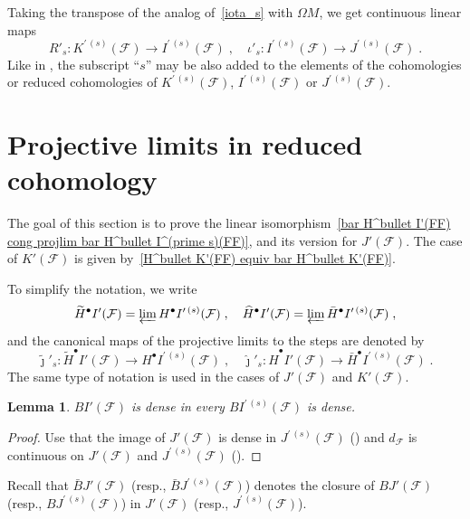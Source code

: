 \documentclass{memo-l}
\theoremstyle{plain}
\newtheorem{lem}[thm]{Lemma}
\theoremstyle{definition}
\theoremstyle{remark}
\newcommand{\FF}{\mathcal{F}}
\numberwithin{section}{chapter}
\numberwithin{equation}{section}%
\begin{document}
Taking the transpose of the analog of~\eqref{iota_s} with $\Omega M$, we get continuous linear maps  
\begin{equation}\label{R'_s}
R'_s:K^{\prime\,(s)}(\FF) \to I^{\prime\,(s)}(\FF)\;,\quad \iota'_s:I^{\prime\,(s)}(\FF)\to J^{\prime\,(s)}(\FF)\;.
\end{equation}
Like in , the subscript ``$s$'' may be also added to the elements of the cohomologies or reduced cohomologies of $K^{\prime\,(s)}(\FF)$, $I^{\prime\,(s)}(\FF)$ or $J^{\prime\,(s)}(\FF)$. 



\section{Projective limits in reduced cohomology}\label{s: proj lims in reduced cohom}

The goal of this section is to prove the linear isomorphism~\eqref{bar H^bullet I'(FF) cong projlim bar H^bullet I^(prime s)(FF)}, and its version for $J'(\FF)$. The case of $K'(\FF)$ is given by~\eqref{H^bullet K'(FF) equiv bar H^bullet K'(FF)}.

To simplify the notation, we write \index{$\widetilde H^\bullet I'(\FF)$} \index{$\widehat H^\bullet I'(\FF)$}
\[
\widetilde H^\bullet I'(\FF)=\varprojlim H^\bullet I^{\prime\,(s)}(\FF)\;,\quad
\widehat H^\bullet I'(\FF)=\varprojlim\bar H^\bullet I^{\prime\,(s)}(\FF)\;,
\]
and the canonical maps of the projective limits to the steps are denoted by  
\[
\tilde\jmath'_s:\widetilde H^\bullet I'(\FF)\to H^\bullet I^{\prime\,(s)}(\FF)\;,\quad
\hat\jmath'_s:\widehat H^\bullet I'(\FF)\to\bar H^\bullet I^{\prime\,(s)}(\FF)\;.
\]
The same type of notation is used in the cases of $J'(\FF)$ and $K'(\FF)$.

\begin{lem}\label{l: j'_s: BJ'(FF) to BJ^prime (s)(FF) is dense}
$BI'(\FF)$ is dense in every $BI^{\prime\,(s)}(\FF)$ is dense.
\end{lem}

\begin{proof}
Use that the image of $J'(\FF)$ is dense in $J^{\prime\,(s)}(\FF)$ () and $d_\FF$ is continuous on $J'(\FF)$ and $J^{\prime\,(s)}(\FF)$ ().
\end{proof}

Recall that $\bar BJ'(\FF)$ (resp., $\bar BJ^{\prime\,(s)}(\FF)$) denotes the closure of $BJ'(\FF)$ (resp., $BJ^{\prime\,(s)}(\FF)$) in $J'(\FF)$ (resp., $J^{\prime\,(s)}(\FF)$).
\end{document}
